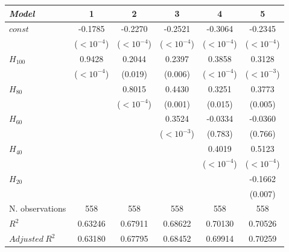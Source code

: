 \begin{tabular}{lccccc}
\toprule
\textit{Model} & 1 & 2 & 3 & 4 & 5 \\
\midrule
$\mathit{const}$ & -0.1785 & -0.2270 & -0.2521 & -0.3064 & -0.2345 \\
 & {\scriptsize ($<10^{-4}$)} & {\scriptsize ($<10^{-4}$)} & {\scriptsize ($<10^{-4}$)} & {\scriptsize ($<10^{-4}$)} & {\scriptsize ($<10^{-4}$)} \\
$H_{100}$ & 0.9428 & 0.2044 & 0.2397 & 0.3858 & 0.3128 \\
 & {\scriptsize ($<10^{-4}$)} & {\scriptsize (0.019)} & {\scriptsize (0.006)} & {\scriptsize ($<10^{-4}$)} & {\scriptsize ($<10^{-3}$)} \\
$H_{80}$ &  & 0.8015 & 0.4430 & 0.3251 & 0.3773 \\
 &  & {\scriptsize ($<10^{-4}$)} & {\scriptsize (0.001)} & {\scriptsize (0.015)} & {\scriptsize (0.005)} \\
$H_{60}$ &  &  & 0.3524 & -0.0334 & -0.0360 \\
 &  &  & {\scriptsize ($<10^{-3}$)} & {\scriptsize (0.783)} & {\scriptsize (0.766)} \\
$H_{40}$ &  &  &  & 0.4019 & 0.5123 \\
 &  &  &  & {\scriptsize ($<10^{-4}$)} & {\scriptsize ($<10^{-4}$)} \\
$H_{20}$ &  &  &  &  & -0.1662 \\
 &  &  &  &  & {\scriptsize (0.007)} \\
\midrule
N. observations & 558 & 558 & 558 & 558 & 558 \\
$R^2$ & 0.63246 & 0.67911 & 0.68622 & 0.70130 & 0.70526 \\
$\mathit{Adjusted}~R^2$ & 0.63180 & 0.67795 & 0.68452 & 0.69914 & 0.70259 \\
\bottomrule
\end{tabular}
